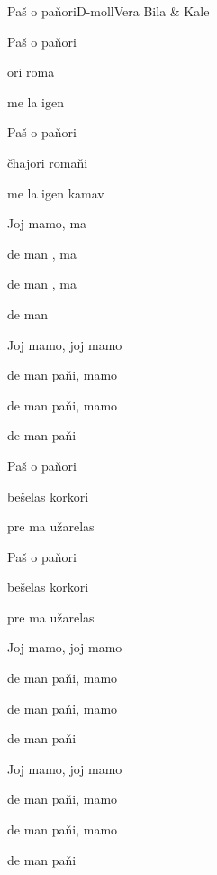 \begin{song}{Paš o paňori}{D-moll}{}{Vera Bila \& Kale}{}{}

  \begin{SBVerse}
    Paš o paňori

    ori roma

    me la igen 

    Paš o paňori

    čhajori romaňi

    me la igen kamav
  \end{SBVerse}

  \begin{SBChorus}
    Joj mamo,  ma

    de man , ma

    de man , ma

    de man 

    Joj mamo, joj mamo

    de man paňi, mamo

    de man paňi, mamo

    de man paňi
  \end{SBChorus}

  \begin{SBVerse}
    Paš o paňori

    bešelas korkori

    pre ma užarelas

    Paš o paňori

    bešelas korkori

    pre ma užarelas
  \end{SBVerse}

  \begin{SBChorus}
    Joj mamo, joj mamo

    de man paňi, mamo

    de man paňi, mamo

    de man paňi

    Joj mamo, joj mamo

    de man paňi, mamo

    de man paňi, mamo

    de man paňi
  \end{SBChorus}

\end{song}
